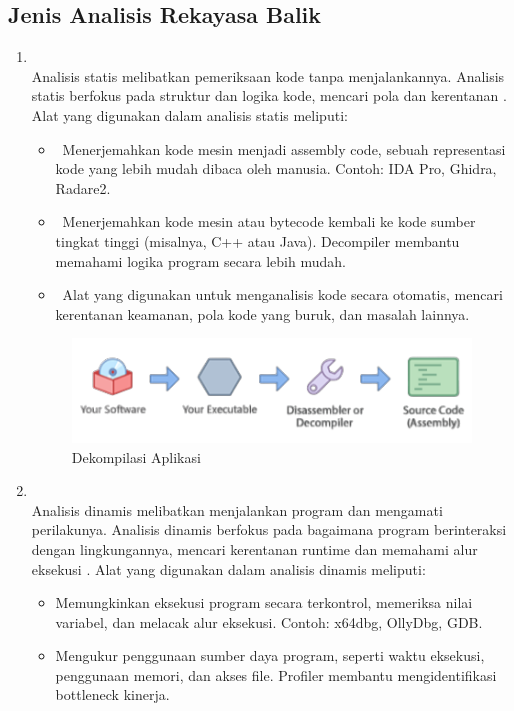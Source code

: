 \subsection{Jenis Analisis Rekayasa Balik}
\begin{enumerate}
	\item {}\\
	      Analisis statis melibatkan pemeriksaan kode tanpa menjalankannya. Analisis statis berfokus pada struktur dan logika kode, mencari pola dan kerentanan \cite{Sec19}. Alat yang digunakan dalam analisis statis meliputi:
	      \begin{itemize}
		      \item {}  Menerjemahkan kode mesin menjadi assembly code, sebuah representasi kode yang lebih mudah dibaca oleh manusia. Contoh: IDA Pro, Ghidra, Radare2.
		      \item {}  Menerjemahkan kode mesin atau bytecode kembali ke kode sumber tingkat tinggi (misalnya, C++ atau Java). Decompiler membantu memahami logika program secara lebih mudah.
		      \item {}  Alat yang digunakan untuk menganalisis kode secara otomatis, mencari kerentanan keamanan, pola kode yang buruk, dan masalah lainnya.
	      \end{itemize}

	      \begin{figure}
		      \centering
		      \includegraphics[width=.75\textwidth]
		      {assets/pics/program_decompile.png}
		      \caption{Dekompilasi Aplikasi \cite{Ore06}}
	      \end{figure}
	\item {} \\
	      Analisis dinamis melibatkan menjalankan program dan mengamati perilakunya. Analisis dinamis berfokus pada bagaimana program berinteraksi dengan lingkungannya, mencari kerentanan runtime dan memahami alur eksekusi \cite{Sec19}.  Alat yang digunakan dalam analisis dinamis meliputi:
	      \begin{itemize}
		      \item {} Memungkinkan eksekusi program secara terkontrol, memeriksa nilai variabel, dan melacak alur eksekusi. Contoh: x64dbg, OllyDbg, GDB.
		      \item {} Mengukur penggunaan sumber daya program, seperti waktu eksekusi, penggunaan memori, dan akses file. Profiler membantu mengidentifikasi bottleneck kinerja.
	      \end{itemize}
\end{enumerate}

